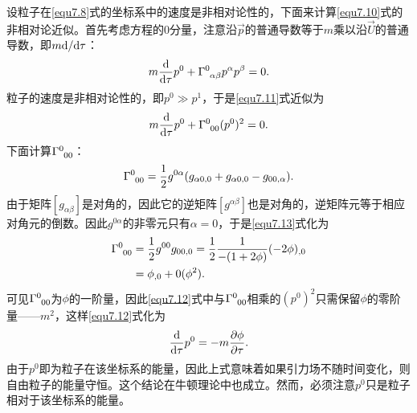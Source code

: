 设粒子在\eqref{equ7.8}式的坐标系中的速度是非相对论性的，下面来计算\eqref{equ7.10}式的非相对论近似。首先考虑方程的0分量，注意沿$\vec{p}$的普通导数等于$m$乘以沿$\vec{U}$的普通导数，即$m \mathrm{d} / \mathrm{d} \tau$：
\begin{equation}
    m \frac{\rd}{\rd \tau} p^0 + \Gamma\indices{^0_{\alpha \beta}} p^\alpha p^\beta = 0.
\label{equ7.11}
\end{equation}
粒子的速度是非相对论性的，即$p^0 \gg p^1$，于是\eqref{equ7.11}式近似为
\begin{equation}
    m \frac{\rd}{\rd \tau} p^0 + \Gamma\indices{^0_{00}} (p^0)^2 = 0.
\label{equ7.12}
\end{equation}
下面计算$\Gamma\indices{^0_{00}}$：
\begin{equation}
    \Gamma\indices{^0_{00}} = \frac{1}{2} g^{0 \alpha} (g_{\alpha 0, 0} + g_{\alpha 0, 0} - g_{00, \alpha}).
\label{equ7.13}
\end{equation}
由于矩阵$[g_{\alpha \beta}]$是对角的，因此它的逆矩阵$[g^{\alpha \beta}]$也是对角的，逆矩阵元等于相应对角元的倒数。因此$g^{0 \alpha}$的非零元只有$\alpha = 0$，于是\eqref{equ7.13}式化为
\begin{align}
    \Gamma\indices{^0_{00}} &= \frac{1}{2} g^{00} g_{00, 0} = \frac{1}{2} \frac{1}{-(1 + 2\phi)} (-2\phi)_{, 0} \notag \\
    &= \phi_{, 0} + 0(\phi^2). \label{equ7.14}
\end{align}
可见$\Gamma\indices{^0_{00}}$为$\phi$的一阶量，因此\eqref{equ7.12}式中与$\Gamma\indices{^0_{00}}$相乘的$(p^0)^2$只需保留$\phi$的零阶量——$m^2$，这样\eqref{equ7.12}式化为
\begin{equation}
    \frac{\mathrm{d}}{\mathrm{d} \tau} p^0 = -m \frac{\partial \phi}{\partial \tau}.
\label{equ7.15}
\end{equation}
由于$p^0$即为粒子在该坐标系的能量，因此上式意味着如果引力场不随时间变化，则自由粒子的能量守恒。这个结论在牛顿理论中也成立。然而，必须注意$p^0$只是粒子相对于该坐标系的能量。

